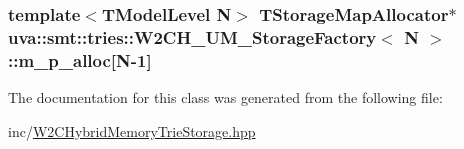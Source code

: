 \subsubsection[{m\+\_\+p\+\_\+alloc}]{\setlength{\rightskip}{0pt plus 5cm}template$<$T\+Model\+Level N$>$ {\bf T\+Storage\+Map\+Allocator}$\ast$ {\bf uva\+::smt\+::tries\+::\+W2\+C\+H\+\_\+\+U\+M\+\_\+\+Storage\+Factory}$<$ N $>$\+::m\+\_\+p\+\_\+alloc\mbox{[}N-\/1\mbox{]}\hspace{0.3cm}{\ttfamily [protected]}}\label{classuva_1_1smt_1_1tries_1_1_w2_c_h___u_m___storage_factory_aff21d6e056fe54bcd597336aff02ef0b}


The documentation for this class was generated from the following file\+:\begin{DoxyCompactItemize}
\item 
inc/\hyperlink{_w2_c_hybrid_memory_trie_storage_8hpp}{W2\+C\+Hybrid\+Memory\+Trie\+Storage.\+hpp}\end{DoxyCompactItemize}
